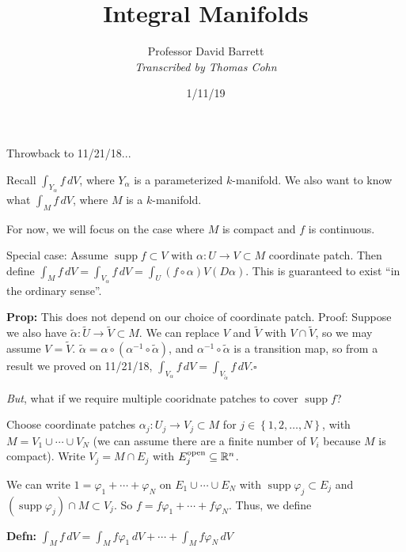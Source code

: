 \documentclass[10pt,letterpaper]{article}
\author{Professor David Barrett\\ \small\textit{Transcribed by Thomas Cohn}}
\title{Integral Manifolds}
\date{1/11/19} %
\newcommand{\n}{\hfill\break}
\newcommand{\up}{\vspace{-\baselineskip}}
\newcommand{\defn}[1]{\par\noindent\settowidth{\hangindent}{\textbf{Defn: }}\textbf{Defn: }#1\n}
\newcommand{\prop}[1]{\par\noindent\settowidth{\hangindent}{\textbf{Prop: }}\textbf{Prop: }#1\n}
\newcommand{\proven}{\;$\square$\n}
\newcommand{\ptxt}[1]{\textrm{\textnormal{#1}}}
\newcommand{\set}[1]{\left\{#1\right\}}
\newcommand{\reals}{\mathbb{R}}
\newcommand{\R}{\reals}
\newcommand{\inv}{^{-1}}
\newcommand{\of}{\circ}
\DeclareMathOperator{\supp}{supp}
\begin{document}
\maketitle
\setlength\RaggedRightParindent{\parindent}
\RaggedRight

\par\noindent Throwback to 11/21/18...\n

\par\noindent Recall $\int_{Y_{\alpha}}f\,dV$, where $Y_{\alpha}$ is a parameterized $k$-manifold.\n
We also want to know what $\int_{M}f\,dV$, where $M$ is a $k$-manifold.\n

\par\noindent For now, we will focus on the case where $M$ is compact and $f$ is continuous.\n

\par\noindent Special case: Assume $\supp{}f\subset{}V$ with $\alpha:U\to{}V\subset{}M$ coordinate patch.\n
Then define $\int_{M}f\,dV=\int_{V_{\alpha}}f\,dV=\int_{U}(f\of\alpha)V(D\alpha)$. This is guaranteed to exist ``in the ordinary sense''.\n

\prop{This does not depend on our choice of coordinate patch.\n
Proof: Suppose we also have $\tilde{\alpha}:\tilde{U}\to\tilde{V}\subset{}M$. We can replace $V$ and $\tilde{V}$ with $V\cap\tilde{V}$, so we may assume $V=\tilde{V}$. $\tilde{\alpha}=\alpha\of(\alpha\inv\of\tilde{\alpha})$, and $\alpha\inv\of\tilde{\alpha}$ is a transition map, so from a result we proved on 11/21/18, $\int_{V_{\alpha}}f\,dV=\int_{V_{\tilde{\alpha}}}f\,dV$.\proven}

\up
\par\noindent\textit{But}, what if we require multiple cooridnate patches to cover $\supp{}f$?\n

\par\noindent Choose coordinate patches $\alpha_{j}:U_{j}\to{}V_{j}\subset{}M$ for $j\in\set{1,2,\ldots,N}$, with $M=V_{1}\cup\cdots\cup{}V_{N}$ (we can assume there are a finite number of $V_{i}$ because $M$ is compact). Write $V_{j}=M\cap{}E_{j}$ with $E_{j}^{\ptxt{open}}\subseteq\R^{n}$.\n

\par\noindent We can write $1=\varphi_{1}+\cdots+\varphi_{N}$ on $E_{1}\cup\cdots\cup{}E_{N}$ with $\supp\varphi_{j}\subset{}E_{j}$ and $(\supp\varphi_{j})\cap{}M\subset{}V_{j}$.\n
So $f=f\varphi_{1}+\cdots+f\varphi_{N}$. Thus, we define\n

\defn{$\displaystyle\int_{M}f\,dV=\int_{M}f\varphi_{1}\,dV+\cdots+\int_{M}f\varphi_{N}\,dV$}
\end{document}
